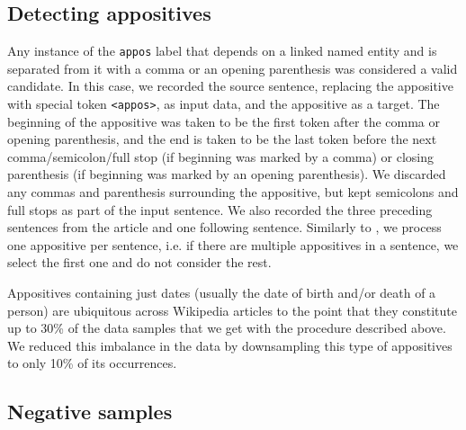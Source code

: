 \documentclass[11pt]{article}
\newcommand{\yktodo}[1]{\todo[color=green!20]{#1}}
\newcommand{\jttodo}[1]{\todo[color=blue!20]{#1}}
\begin{document}
\subsection{Detecting  appositives}
Any instance of the \texttt{appos} label that depends on a linked named entity and is separated from it with a comma or an opening parenthesis was considered a valid candidate. In this case, we recorded the source sentence, replacing the appositive with special token \texttt{<appos>}, as input data, and the appositive as a target. The beginning of the appositive was taken to be the first token after the comma or opening parenthesis, and the end is taken to be the last token before the next comma/semicolon/full stop (if beginning was marked by a comma) or closing parenthesis (if beginning was marked by an opening parenthesis). We discarded any commas and parenthesis surrounding the appositive, but kept semicolons and full stops as part of the input sentence. We also recorded the three preceding sentences from the article and one following sentence.
Similarly to , we process one appositive per sentence, i.e. if there are multiple appositives in a sentence, we select the first one and do not consider the rest.

Appositives containing just dates (usually the date of birth and/or death of a person) are ubiquitous across Wikipedia articles to the point that they constitute up to 30\% of the data samples that we get with the procedure described above. 
We reduced this imbalance in the data by downsampling this type of appositives to only 10\% of its occurrences. 

\subsection{Negative samples}
\end{document}
